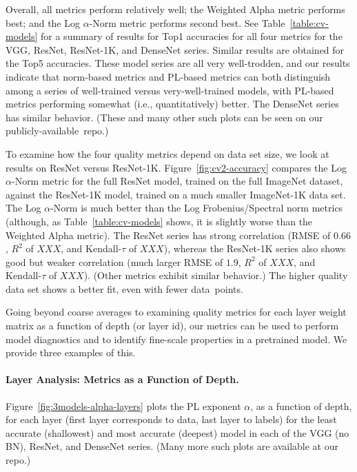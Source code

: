 Overall, all metrics perform relatively well; the Weighted Alpha metric performs best; and the Log $\alpha$-Norm metric performs second best.
See Table~\ref{table:cv-models} for a summary of results for Top1 accuracies for all four metrics for the VGG, ResNet, ResNet-1K, and DenseNet series.
Similar results are obtained for the Top5 accuracies.
These model series are all very well-trodden, and our results indicate that norm-based metrics and PL-based metrics can both distinguish among a series of well-trained versus very-well-trained models, with PL-based metrics performing somewhat (i.e., quantitatively) better.
The DenseNet series has similar behavior.
(These and many other such plots can be seen on our publicly-available~repo.)


To examine how the four quality metrics depend on data set size, we look at results on ResNet versus ResNet-1K.
Figure~\ref{fig:cv2-accuracy} compares the Log $\alpha$-Norm metric for the full ResNet model, trained on the full ImageNet dataset, against the ResNet-1K model, trained on a much smaller ImageNet-1K data set.
The Log $\alpha$-Norm is much better than the Log Frobenius/Spectral norm metrics (although, as Table~\ref{table:cv-models} shows, it is slightly worse than the Weighted Alpha metric).
The ResNet series has strong correlation (RMSE of $0.66$, $R^2$ of $XXX$, and Kendall-$\tau$ of $XXX$), whereas the ResNet-1K series also shows good but weaker correlation (much larger RMSE of $1.9$, $R^2$ of $XXX$, and Kendall-$\tau$ of $XXX$).
(Other metrics exhibit similar behavior.)
The higher quality data set shows a better fit, even with fewer data~points.

Going beyond coarse averages to examining quality metrics for each layer weight matrix as a function of depth (or layer id), our metrics can be used to perform model diagnostics and to identify fine-scale properties in a pretrained model.
We provide three examples of this.


\paragraph{Layer Analysis: Metrics as a Function of Depth.}

Figure~\ref{fig:3models-alpha-layers} plots the PL exponent $\alpha$, as a function of depth, for each layer (first layer corresponds to data, last layer to labels) for the least accurate (shallowest) and most accurate (deepest) model in each of the VGG (no BN), ResNet, and DenseNet series.
(Many more such plots are available at our repo.)

